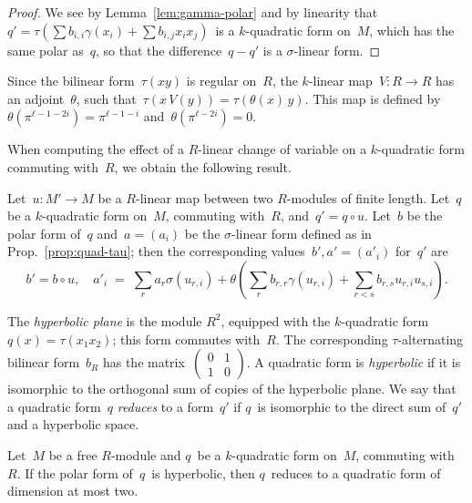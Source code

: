 \documentclass{lms}
\def\pa#1{\left(#1\right)}
\def\mat#1{\begin{pmatrix}#1\end{pmatrix}}
\begin{document}
\begin{proof}
We see by Lemma~\ref{lem:gamma-polar} and by linearity that
$q' = τ(∑ b_{i,i} γ(x_i) + ∑ b_{i,j} x_i x_j)$~is a $k$-quadratic form on~$M$,
which has the same polar as~$q$,
so that the difference~$q - q'$ is a $σ$-linear form.
\end{proof}

Since the bilinear form~$τ(x y)$ is regular on~$R$, the $k$-linear
map~$V: R → R$ has an adjoint~$θ$, such that~$τ(x\, V(y)) = τ(θ(x)\, y)$.
This map is defined by~$θ(π^{ℓ-1-2i}) = π^{ℓ-1-i}$ and~$θ(π^{ℓ-2i}) = 0$.

When computing the effect of a $R$-linear change of variable on a
$k$-quadratic form commuting with~$R$, we obtain the following result.

\begin{prop}\label{prop:quad-changevar}
Let~$u: M' → M$ be a $R$-linear map between two $R$-modules of finite length.
Let~$q$ be a $k$-quadratic form on~$M$, commuting with~$R$, and~$q' = q ∘ u$.
Let~$b$ be the polar form of~$q$ and~$a = (a_i)$ be the $σ$-linear form defined
as in Prop.~\ref{prop:quad-tau}; then the corresponding values~$b', a' =
(a'_i)$
for~$q'$ are
\begin{equation*}
b' = b ∘ u, \quad
a'_i \;=\; ∑_r a_r σ(u_{r,i})
  + θ \pa{ ∑_r b_{r,r} γ(u_{r,i}) + ∑_{r < s} b_{r,s} u_{r,i} u_{s,i} }.
\end{equation*}
\end{prop}

The \emph{hyperbolic plane} is the module $R^2$, equipped with the
$k$-quadratic form~$q(x) = τ(x_1 x_2)$; this form commutes with~$R$. The
corresponding $τ$-alternating bilinear form~$b_R$ has the
matrix~$\mat{0&1\\1&0}$. A quadratic form is \emph{hyperbolic} if it is
isomorphic to the orthogonal sum of copies of the hyperbolic plane.
We say that a quadratic form~$q$ \emph{reduces} to a form~$q'$ if $q$~is
isomorphic to the direct sum of~$q'$ and a hyperbolic space.

\begin{prop}\label{prop:witt-four}
Let~$M$ be a free $R$-module and $q$~be a $k$-quadratic form on~$M$,
commuting with~$R$.
If the polar form of~$q$~is hyperbolic, then $q$~reduces to a quadratic
form of dimension at most two.
\end{prop}
\end{document}
